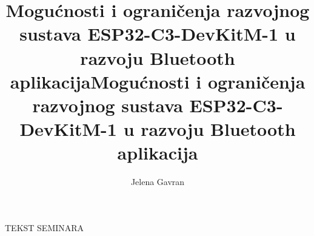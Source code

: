 \documentclass[times, utf8, seminar, numeric]{fer}
\begin{document}
\title{Mogućnosti i ograničenja razvojnog sustava ESP32-C3-DevKitM-1 u razvoju Bluetooth aplikacija}

\author{Jelena Gavran}


\maketitle

\tableofcontents

\begingroup
\renewcommand*\listfigurename{Popis slika}
\listoffigures
\endgroup












\title{Mogućnosti i ograničenja razvojnog sustava ESP32-C3-DevKitM-1 u razvoju Bluetooth aplikacija}
\begin{sazetak}
	TEKST SEMINARA 
	
\end{sazetak}
\end{document}
